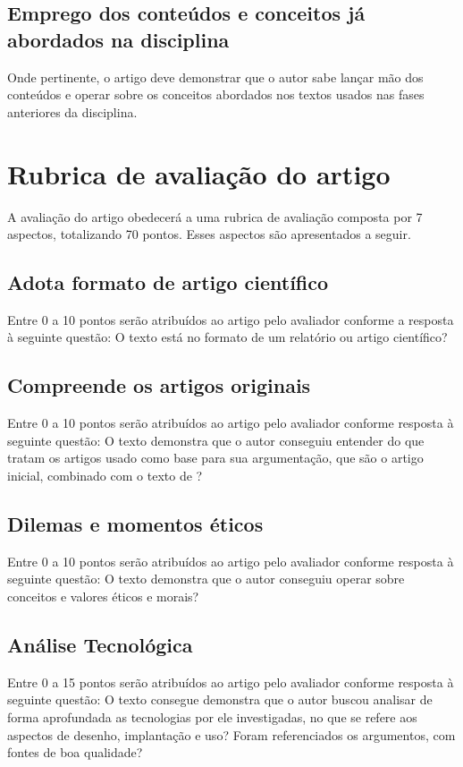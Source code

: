 \documentclass[12pt]{article}
\begin{document}
	\subsection{\label{conteudos}Emprego dos conteúdos e conceitos já abordados na disciplina}
	
	Onde pertinente, o artigo deve demonstrar que o autor sabe lançar mão dos conteúdos e operar sobre os conceitos abordados nos textos usados nas fases anteriores da disciplina.
	
	\section{\label{rubrica}Rubrica de avaliação do artigo}
	A avaliação do artigo obedecerá a uma rubrica de avaliação composta por 7 aspectos, totalizando 70 pontos. Esses aspectos são apresentados a seguir.
	
	\subsection{Adota formato de artigo científico}
	Entre 0 a 10 pontos serão atribuídos ao artigo pelo avaliador conforme a resposta à seguinte questão: O texto está no formato de um relatório ou artigo científico?
	
	\subsection{Compreende os artigos originais}
	
	Entre 0 a 10 pontos serão atribuídos ao artigo pelo avaliador conforme resposta à seguinte questão: O texto demonstra que o autor conseguiu entender do que tratam os artigos usado como base para sua argumentação, que são o artigo inicial, combinado com o texto de \citet{jones_teaching_2016}?
	
	\subsection{Dilemas e momentos éticos}
	Entre 0 a 10 pontos serão atribuídos ao artigo pelo avaliador conforme resposta à seguinte questão: O texto demonstra que o autor conseguiu operar sobre conceitos e valores éticos e morais? 
	
	\subsection{Análise Tecnológica}
	Entre 0 a 15 pontos serão atribuídos ao artigo pelo avaliador conforme resposta à seguinte questão: O texto consegue demonstra que o autor buscou analisar de forma aprofundada as tecnologias por ele investigadas, no que se refere aos aspectos de desenho, implantação e uso? Foram referenciados os argumentos, com fontes de boa qualidade?
	
\end{document}
